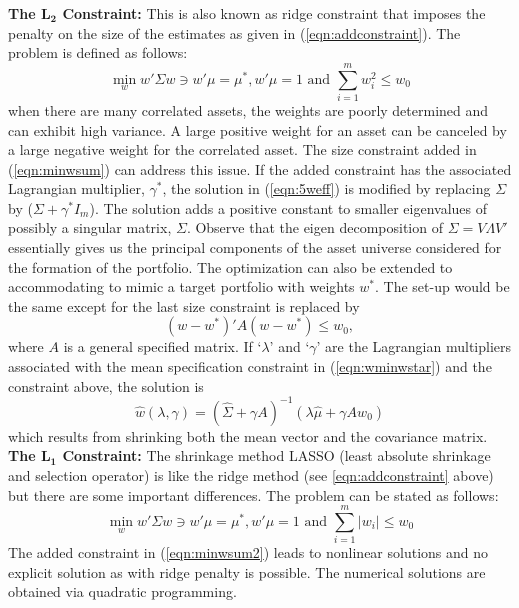 \noindent \textbf{The $\mathbf{L_2}$ Constraint:} This is also known as ridge constraint that imposes the penalty on the size of the estimates as given in (\ref{eqn:addconstraint}). The problem is defined as follows:
	\begin{equation}\label{eqn:minwsum}
	\min_w w' \Sigma w \ni w' \mu=\mu^*, w'\mu=1 \text{ and }\sum_{i=1}^m w_i^2 \leq w_0
	\end{equation}
when there are many correlated assets, the weights are poorly determined and can exhibit high variance. A large positive weight for an asset can be canceled by a large negative weight for the correlated asset. The size constraint added in (\ref{eqn:minwsum}) can address this issue. If the added constraint has the associated Lagrangian multiplier, $\gamma^*$, the solution in (\ref{eqn:5weff}) is modified by replacing $\Sigma$ by ($\Sigma + \gamma^* I_m$). The solution adds a positive constant to smaller eigenvalues of possibly a singular matrix, $\Sigma$. Observe that the eigen decomposition of $\Sigma= V \Lambda V'$ essentially gives us the principal components of the asset universe considered for the formation of the portfolio. The optimization can also be extended to accommodating to mimic a target portfolio with weights $w^*$. The set-up would be the same except for the last size constraint is replaced by
	\begin{equation}\label{eqn:wminwstar}
	(w-w^*)' A(w-w^*) \leq w_0,
	\end{equation}
where $A$ is a general specified matrix. If `$\lambda$' and `$\gamma$' are the Lagrangian multipliers associated with the mean specification constraint in (\ref{eqn:wminwstar}) and the constraint above, the solution is
	\begin{equation}\label{eqn:hatwlambdagamma}
	\hat{w}(\lambda,\gamma)=(\hat{\Sigma} + \gamma A)^{-1} (\lambda \hat{\mu} + \gamma A w_0)
	\end{equation}
which results from shrinking both the mean vector and the covariance matrix. \\


\noindent \textbf{The $\mathbf{L_1}$ Constraint:} The shrinkage method LASSO (least absolute shrinkage and selection operator) is like the ridge method (see \eqref{eqn:addconstraint} above) but there are some important differences. The problem can be stated as follows:
	\begin{equation}\label{eqn:minwsum2}
	\min_w w'\Sigma w \ni w'\mu=\mu^*, w'\mu=1 \text{ and } \sum_{i=1}^m |w_i| \leq w_0
	\end{equation}
The added constraint in (\ref{eqn:minwsum2}) leads to nonlinear solutions and no explicit solution as with ridge penalty is possible. The numerical solutions are obtained via quadratic programming.


